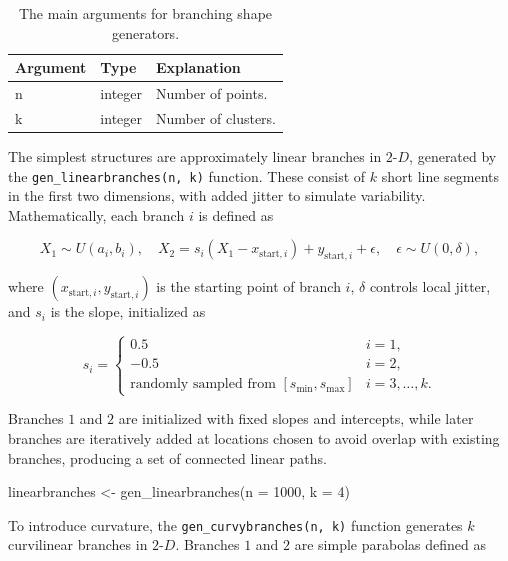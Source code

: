 \documentclass[
  11pt,
  a4paper,
]{report}
\newenvironment{Shaded}{\begin{snugshade}}{\end{snugshade}}
\newcommand{\AttributeTok}[1]{\textcolor[rgb]{0.40,0.45,0.13}{#1}}
\newcommand{\DecValTok}[1]{\textcolor[rgb]{0.68,0.00,0.00}{#1}}
\newcommand{\FunctionTok}[1]{\textcolor[rgb]{0.28,0.35,0.67}{#1}}
\newcommand{\NormalTok}[1]{\textcolor[rgb]{0.00,0.23,0.31}{#1}}
\newcommand{\OtherTok}[1]{\textcolor[rgb]{0.00,0.23,0.31}{#1}}
\newcommand\gD{$2\text{-}D$}
\begin{document}
\begin{table}

\caption{\label{tab:arg-branching-tb-pdf}The main arguments for branching shape generators.}
\centering
\begin{tabular}[t]{>{\raggedright\arraybackslash}p{2cm}>{\raggedright\arraybackslash}p{3cm}l}
\toprule
Argument & Type & Explanation\\
\midrule
n & integer & Number of points.\\
k & integer & Number of clusters.\\
\bottomrule
\end{tabular}
\end{table}

The simplest structures are approximately linear branches in \gD{},
generated by the \texttt{gen\_linearbranches(n,\ k)} function. These
consist of \(k\) short line segments in the first two dimensions, with
added jitter to simulate variability. Mathematically, each branch \(i\)
is defined as

\[
X_1 \sim U(a_i, b_i), \quad X_2 = s_i (X_1 - x_{\text{start},i}) + y_{\text{start},i} + \epsilon, \quad \epsilon \sim U(0, \delta),
\]

where \((x_{\text{start},i}, y_{\text{start},i})\) is the starting point
of branch \(i\), \(\delta\) controls local jitter, and \(s_i\) is the
slope, initialized as

\[
s_i =
\begin{cases}
0.5 & i = 1, \\
-0.5 & i = 2, \\
\text{randomly sampled from } [s_{\min}, s_{\max}] & i = 3, \dots, k.
\end{cases}
\]

Branches \(1\) and \(2\) are initialized with fixed slopes and
intercepts, while later branches are iteratively added at locations
chosen to avoid overlap with existing branches, producing a set of
connected linear paths.

\begin{Shaded}
\begin{Highlighting}[]
\NormalTok{linearbranches }\OtherTok{\textless{}{-}} \FunctionTok{gen\_linearbranches}\NormalTok{(}\AttributeTok{n =} \DecValTok{1000}\NormalTok{, }\AttributeTok{k =} \DecValTok{4}\NormalTok{)}
\end{Highlighting}
\end{Shaded}

To introduce curvature, the \texttt{gen\_curvybranches(n,\ k)} function
generates \(k\) curvilinear branches in \gD{}. Branches \(1\) and \(2\)
are simple parabolas defined as
\end{document}
